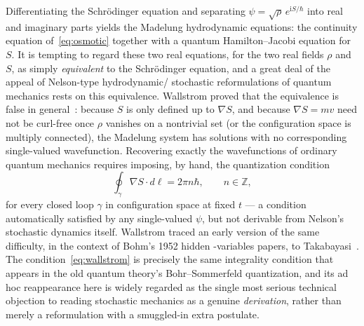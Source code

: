 \documentclass[11pt]{article}
\newcommand{\ii}{\mathrm{i}}
\begin{document}
Differentiating the Schr\"odinger equation and separating 
$\psi=\sqrt\rho\,e^{\ii S/\hbar}$ into real and imaginary parts yields 
the Madelung hydrodynamic equations: the continuity equation 
of~\eqref{eq:osmotic} together with a quantum Hamilton--Jacobi equation for
$S$. It is tempting to regard these two real equations, for the two real
fields $\rho$ and $S$, as simply \emph{equivalent} to the Schr\"odinger
equation, and a great deal of the appeal of Nelson-type hydrodynamic/
stochastic reformulations of quantum mechanics rests on this equivalence.
Wallstrom proved that the equivalence is false in 
general~\cite{wallstrom88,wallstrom94}: because $S$ is only defined up to
$\nabla S$, and because $\nabla S = m v$ need not be curl-free once $\rho$
vanishes on a nontrivial set (or the configuration space is multiply
connected), the Madelung system has solutions with no corresponding 
single-valued wavefunction. Recovering exactly the wavefunctions of
ordinary quantum mechanics requires imposing, by hand, the quantization
condition
\begin{equation}\label{eq:wallstrom}
\oint_{\gamma}\nabla S\cdot d\boldsymbol\ell = 2\pi n\hbar, \qquad n\in\mathbb Z,
\end{equation}
for every closed loop $\gamma$ in configuration space at fixed $t$ --- a
condition automatically satisfied by any single-valued $\psi$, but not
derivable from Nelson's stochastic dynamics itself. Wallstrom traced an
early version of the same difficulty, in the context of Bohm's 1952 hidden
-variables papers, to Takabayasi~\cite{takabayasi52,takabayasi53}. The
condition~\eqref{eq:wallstrom} is precisely the same integrality condition
that appears in the old quantum theory's Bohr--Sommerfeld quantization, and
its ad hoc reappearance here is widely regarded as the single most serious
technical objection to reading stochastic mechanics as a genuine
\emph{derivation}, rather than merely a reformulation with a smuggled-in
extra postulate.
\end{document}
